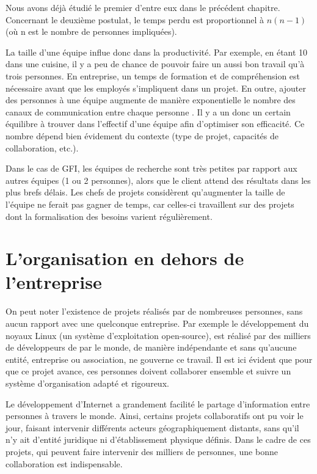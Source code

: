 Nous avons déjà étudié le premier d'entre eux dans le précédent chapitre. Concernant le deuxième postulat, le temps perdu est proportionnel à $ n(n-1) $ (où n est le nombre de personnes impliquées).

La taille d'une équipe influe donc dans la productivité. Par exemple, en étant 10 dans une cuisine, il y a peu de chance de pouvoir faire un aussi bon travail qu'à trois personnes. En entreprise, un temps de formation et de compréhension est nécessaire avant que les employés s'impliquent dans un projet. En outre, ajouter des personnes à une équipe augmente de manière exponentielle le nombre des canaux de communication entre chaque personne . Il y a un donc un certain équilibre à trouver dans l'effectif d'une équipe afin d'optimiser son efficacité. Ce nombre dépend bien évidement du contexte (type de projet, capacités de collaboration, etc.).


\begin{app}
Dans le cas de GFI, les équipes de recherche sont très petites par rapport aux autres équipes (1 ou 2 personnes), alors que le client attend des résultats dans les plus brefs délais. Les chefs de projets considèrent qu'augmenter la taille de l'équipe ne ferait pas gagner de temps, car celles-ci travaillent sur des projets dont la formalisation des besoins varient régulièrement.
\end{app}

\section{L'organisation en dehors de l'entreprise}

On peut noter l'existence de projets réalisés par de nombreuses personnes, sans aucun rapport avec une quelconque entreprise. Par exemple le développement du noyaux Linux (un système d'exploitation open-source), est réalisé par des milliers de développeurs de par le monde, de manière indépendante et sans qu'aucune entité, entreprise ou  association, ne gouverne ce travail. Il est ici évident que pour que ce projet avance, ces personnes doivent collaborer ensemble et suivre un système d'organisation adapté et rigoureux.

Le développement d'Internet a grandement facilité le partage d'information entre personnes à travers le monde. Ainsi, certains projets collaboratifs ont pu voir le jour, faisant intervenir différents acteurs géographiquement distants, sans qu'il n'y ait d'entité juridique ni d'établissement physique définis. Dans le cadre de ces projets, qui peuvent faire intervenir des milliers de personnes, une bonne collaboration est indispensable.

